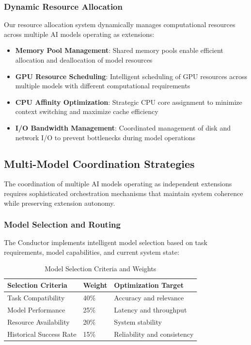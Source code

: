 \subsubsection{Dynamic Resource Allocation}

Our resource allocation system dynamically manages computational resources across multiple AI models operating as extensions:

\begin{itemize}
    \item \textbf{Memory Pool Management}: Shared memory pools enable efficient allocation and deallocation of model resources
    \item \textbf{GPU Resource Scheduling}: Intelligent scheduling of GPU resources across multiple models with different computational requirements
    \item \textbf{CPU Affinity Optimization}: Strategic CPU core assignment to minimize context switching and maximize cache efficiency
    \item \textbf{I/O Bandwidth Management}: Coordinated management of disk and network I/O to prevent bottlenecks during model operations
\end{itemize}

\subsection{Multi-Model Coordination Strategies}

The coordination of multiple AI models operating as independent extensions requires sophisticated orchestration mechanisms that maintain system coherence while preserving extension autonomy.

\subsubsection{Model Selection and Routing}

The Conductor implements intelligent model selection based on task requirements, model capabilities, and current system state:

\begin{table}[ht]
\centering
\begin{tabular}{@{}lll@{}}
\toprule
\textbf{Selection Criteria} & \textbf{Weight} & \textbf{Optimization Target} \\
\midrule
Task Compatibility & 40\% & Accuracy and relevance \\
Model Performance & 25\% & Latency and throughput \\
Resource Availability & 20\% & System stability \\
Historical Success Rate & 15\% & Reliability and consistency \\
\bottomrule
\end{tabular}
\caption{Model Selection Criteria and Weights}
\label{tab:model-selection}
\end{table}


